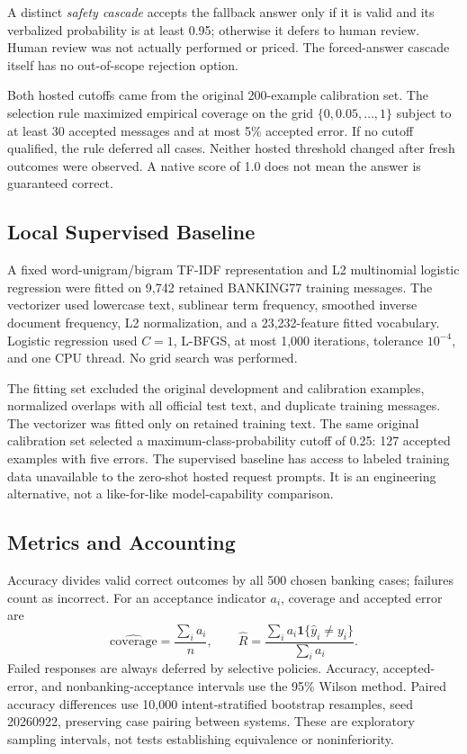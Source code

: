 \documentclass[conference]{IEEEtran}
\newcommand{\ind}{\mathbf{1}}
\begin{document}
A distinct \emph{safety cascade} accepts the fallback answer only if it is valid and its verbalized probability is at least 0.95; otherwise it defers to human review. Human review was not actually performed or priced. The forced-answer cascade itself has no out-of-scope rejection option.

Both hosted cutoffs came from the original 200-example calibration set. The selection rule maximized empirical coverage on the grid $\{0,0.05,\ldots,1\}$ subject to at least 30 accepted messages and at most 5\% accepted error. If no cutoff qualified, the rule deferred all cases. Neither hosted threshold changed after fresh outcomes were observed. A native score of 1.0 does not mean the answer is guaranteed correct.

\subsection{Local Supervised Baseline}
A fixed word-unigram/bigram TF-IDF representation and L2 multinomial logistic regression were fitted on 9,742 retained BANKING77 training messages. The vectorizer used lowercase text, sublinear term frequency, smoothed inverse document frequency, L2 normalization, and a 23,232-feature fitted vocabulary. Logistic regression used $C=1$, L-BFGS, at most 1,000 iterations, tolerance $10^{-4}$, and one CPU thread. No grid search was performed.

The fitting set excluded the original development and calibration examples, normalized overlaps with all official test text, and duplicate training messages. The vectorizer was fitted only on retained training text. The same original calibration set selected a maximum-class-probability cutoff of 0.25: 127 accepted examples with five errors. The supervised baseline has access to labeled training data unavailable to the zero-shot hosted request prompts. It is an engineering alternative, not a like-for-like model-capability comparison.

\subsection{Metrics and Accounting}
Accuracy divides valid correct outcomes by all 500 chosen banking cases; failures count as incorrect. For an acceptance indicator $a_i$, coverage and accepted error are
\begin{equation}
 \widehat{\mathrm{coverage}}=\frac{\sum_i a_i}{n},\qquad
 \widehat R=\frac{\sum_i a_i\ind\{\hat y_i\ne y_i\}}{\sum_i a_i}.
\end{equation}
Failed responses are always deferred by selective policies. Accuracy, accepted-error, and nonbanking-acceptance intervals use the 95\% Wilson method. Paired accuracy differences use 10,000 intent-stratified bootstrap resamples, seed 20260922, preserving case pairing between systems. These are exploratory sampling intervals, not tests establishing equivalence or noninferiority.
\end{document}
